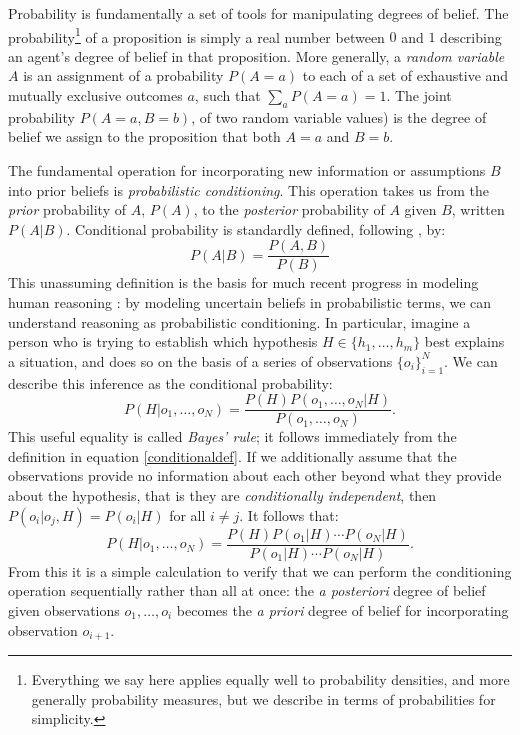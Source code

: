 \documentclass[12pt]{article}
\begin{document}
Probability is fundamentally a set of tools for manipulating degrees of belief. 
The probability\footnote{Everything we say here applies equally well to probability densities, and more generally probability measures, but we describe in terms of probabilities for simplicity.} of a proposition is simply a real number between $0$ and $1$ describing an agent's degree of belief in that proposition. 
More generally, a \emph{random variable} $A$ is an assignment of a probability $P(A{=}a)$ to each of a set of exhaustive and mutually exclusive outcomes $a$, such that $\sum_a P(A{=}a)=1$. 
The joint probability $P(A{=}a,B{=}b)$, of two random variable values) is the degree of belief we assign to the proposition that both $A{=}a$ and $B{=}b$. 


The fundamental operation for incorporating new information or assumptions $B$ into prior beliefs is \emph{probabilistic conditioning}. 
This operation takes us from the \emph{prior} probability of $A$, $P(A)$, to the \emph{posterior} probability of $A$ given $B$, written $P(A|B)$. 
Conditional probability is standardly defined, following \citet{kolmogorov33}, by:
\begin{equation}
\label{conditionaldef}
P(A|B) = \frac{P(A,B)}{P(B)} 
\end{equation}
This unassuming definition is the basis for much recent progress in modeling human reasoning \cite[e.g.][]{tenenbaum2011}: by modeling uncertain beliefs in probabilistic terms, we can understand reasoning as probabilistic conditioning. 
In particular, imagine a person who is trying to establish which hypothesis $H\in\{h_1,\dots,h_m\}$ best explains a situation, and does so on the basis of a series of observations $\{o_i\}_{i=1}^N$. 
We can describe this inference as the conditional probability:
\begin{equation}
P(H|o_1,\dots,o_N) = \frac{P(H)P(o_1,\dots,o_N|H)}{P(o_1,\dots,o_N)}.
\end{equation}
This useful equality is called \emph{Bayes' rule}; it follows immediately from the definition in equation \ref{conditionaldef}. 
If we additionally assume that the observations provide no information about each other beyond what they provide about the hypothesis, that is they are \emph{conditionally independent}, then $P(o_i|o_j, H)=P(o_i|H)$ for all $i\neq j$. 
It follows that:
\begin{equation}
P(H|o_1,\dots,o_N) = \frac{P(H)P(o_1|H)\cdots P(o_N|H)}{P(o_1|H)\cdots P(o_N|H)}.
\end{equation}
From this it is a simple calculation to verify that we can perform the conditioning operation sequentially rather than all at once: the \emph{a posteriori} degree of belief given observations $o_1,\dots,o_i$ becomes the \emph{a priori} degree of belief for incorporating observation $o_{i+1}$.
\end{document}
